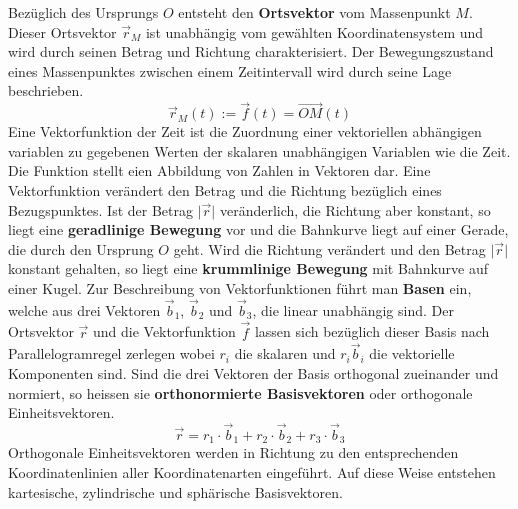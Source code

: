 Bezüglich des Ursprungs $O$ entsteht den \textbf{Ortsvektor} vom Massenpunkt $M$. Dieser Ortsvektor $\overrightarrow{r}_M$ ist unabhängig vom gewählten Koordinatensystem und wird durch seinen Betrag und Richtung charakterisiert. Der Bewegungszustand eines Massenpunktes zwischen einem Zeitintervall wird durch seine Lage beschrieben. 
\begin{equation}
\boxed{\overrightarrow{r}_M(t):=\overrightarrow{f}(t)=\overrightarrow{OM}(t)}
\end{equation}
Eine Vektorfunktion der Zeit ist die Zuordnung einer vektoriellen abhängigen variablen zu gegebenen Werten der skalaren unabhängigen Variablen wie die Zeit. Die Funktion stellt eien Abbildung von Zahlen in Vektoren dar. Eine Vektorfunktion verändert den Betrag und die Richtung bezüglich eines Bezugspunktes. 
\newline\newline
Ist der Betrag $\Big\vert\overrightarrow{r}\Big\vert$ veränderlich, die Richtung aber konstant, so liegt eine \textbf{geradlinige Bewegung} vor und die Bahnkurve liegt auf einer Gerade, die durch den Ursprung $O$ geht. 
\newline\newline
Wird die Richtung verändert und den Betrag $\Big\vert\overrightarrow{r}\Big\vert$ konstant gehalten, so liegt eine \textbf{krummlinige Bewegung} mit Bahnkurve auf einer Kugel. 
\newline\newline
Zur Beschreibung von Vektorfunktionen führt man \textbf{Basen} ein, welche aus drei Vektoren $\overrightarrow{b}_1$, $\overrightarrow{b}_2$ und $\overrightarrow{b}_3$, die linear unabhängig sind. 
\newline\newline
Der Ortsvektor $\overrightarrow{r}$ und die Vektorfunktion $\overrightarrow{f}$ lassen sich bezüglich dieser Basis nach Parallelogramregel zerlegen wobei $r_i$ die skalaren und $r_i\overrightarrow{b}_i$ die vektorielle Komponenten sind. Sind die drei Vektoren der Basis orthogonal zueinander und normiert, so heissen sie \textbf{orthonormierte Basisvektoren} oder orthogonale Einheitsvektoren.
\begin{equation}
\boxed{\overrightarrow{r}=r_1\cdot\overrightarrow{b}_1+r_2\cdot\overrightarrow{b}_2+r_3\cdot\overrightarrow{b}_3}
\end{equation}
Orthogonale Einheitsvektoren werden in Richtung zu den entsprechenden Koordinatenlinien aller Koordinatenarten eingeführt. Auf diese Weise entstehen kartesische, zylindrische und sphärische Basisvektoren.
